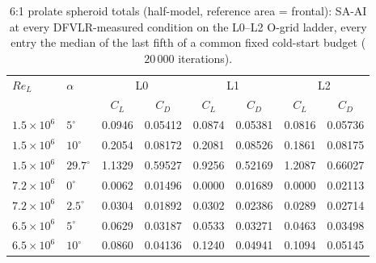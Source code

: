 \begin{table}[tp]
  \centering\small
  \caption{6:1 prolate spheroid totals (half-model, reference area = frontal): SA-AI at every DFVLR-measured condition on the L0--L2 O-grid ladder, every entry the median of the last fifth of a common fixed cold-start budget ($20\,000$ iterations).}
  \label{tab:sphtotals}
  \begin{tabular}{ll cc cc cc}
    \toprule
    $Re_L$ & $\alpha$ & \multicolumn{2}{c}{L0} & \multicolumn{2}{c}{L1} & \multicolumn{2}{c}{L2} \\ & & $C_L$ & $C_D$ & $C_L$ & $C_D$ & $C_L$ & $C_D$ \\
    \midrule
    $1.5\times10^6$ & $5^\circ$ & 0.0946 & 0.05412 & 0.0874 & 0.05381 & 0.0816 & 0.05736 \\
    $1.5\times10^6$ & $10^\circ$ & 0.2054 & 0.08172 & 0.2081 & 0.08526 & 0.1861 & 0.08175 \\
    $1.5\times10^6$ & $29.7^\circ$ & 1.1329 & 0.59527 & 0.9256 & 0.52169 & 1.2087 & 0.66027 \\
    $7.2\times10^6$ & $0^\circ$ & 0.0062 & 0.01496 & 0.0000 & 0.01689 & 0.0000 & 0.02113 \\
    $7.2\times10^6$ & $2.5^\circ$ & 0.0304 & 0.01892 & 0.0302 & 0.02386 & 0.0289 & 0.02714 \\
    $6.5\times10^6$ & $5^\circ$ & 0.0629 & 0.03187 & 0.0533 & 0.03271 & 0.0463 & 0.03498 \\
    $6.5\times10^6$ & $10^\circ$ & 0.0860 & 0.04136 & 0.1240 & 0.04941 & 0.1094 & 0.05145 \\
    \bottomrule
  \end{tabular}
\end{table}
